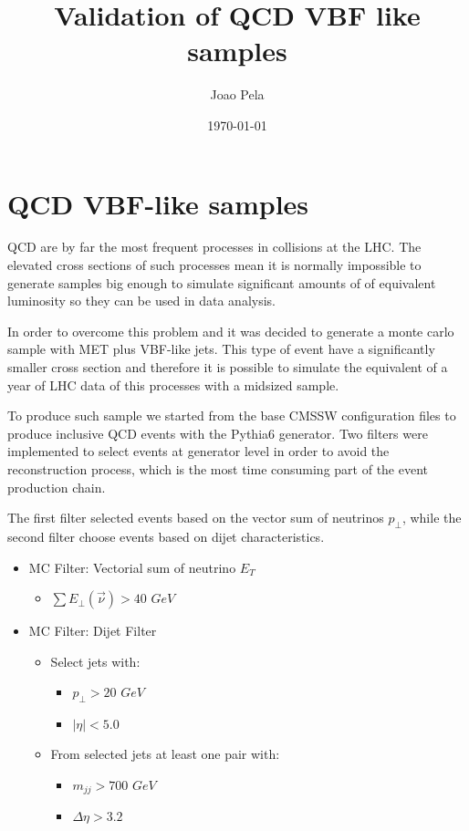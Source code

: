 \documentclass[a4paper,10pt]{article}
\title{Validation of QCD VBF like samples}
\author{Joao Pela}
\date{\today}
\begin{document}
\maketitle

\section{QCD VBF-like samples}

QCD are by far the most frequent processes in collisions at the LHC. The elevated cross sections of such processes mean it is normally impossible to generate samples big enough to simulate 
significant amounts of of equivalent luminosity so they can be used in data analysis. 

In order to overcome this problem and it was decided to generate a monte carlo sample with MET plus VBF-like jets. This type of event have a significantly smaller cross section and therefore
it is possible to simulate the equivalent of a year of LHC data of this processes with a midsized sample.

To produce such sample we started from the base CMSSW configuration files to produce inclusive QCD events with the Pythia6 generator. Two filters were implemented to select events at generator
level in order to avoid the reconstruction process, which is the most time consuming part of the event production chain. 

The first filter selected events based on the vector sum of neutrinos $p_\perp$, while the second filter choose events based on dijet characteristics.

\begin{itemize}
  \item MC Filter: Vectorial sum of neutrino $E_T$
  \begin{itemize}
     \item $\sum E_\perp(\vec{\nu}) > 40$ $GeV$
  \end{itemize}

  
  \item MC Filter: Dijet Filter
  \begin{itemize}
    \item Select jets with:
    \begin{itemize}
      \item $p_\perp>20$ $GeV$
      \item $|\eta|<5.0$
    \end{itemize}
    \item From selected jets at least one pair with:
    \begin{itemize}
      \item $m_{jj}>700$ $GeV$
      \item $\Delta\eta>3.2$
    \end{itemize}    
  \end{itemize}
  
\end{itemize}
\end{document}
